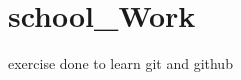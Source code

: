 \chapter{school\+\_\+\+Work}
\hypertarget{md__r_e_a_d_m_e}{}\label{md__r_e_a_d_m_e}
\label{md__r_e_a_d_m_e_autotoc_md0}%
%


exercise done to learn git and github 